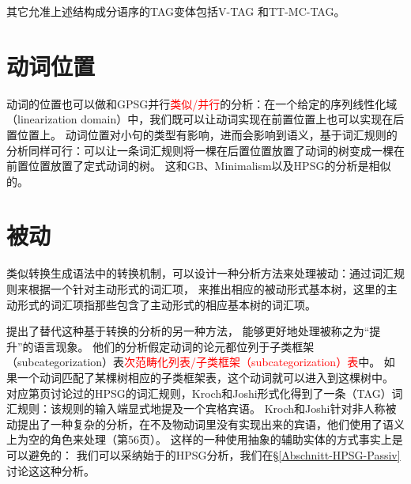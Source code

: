 其它允准上述结构成分语序的TAG变体包括V-TAG\citep{Rambow94a} 
和TT-MC-TAG\citep{Lichte2007a}。

\section{动词位置}

动词的位置也可以做和GPSG并行\textcolor{red}{类似/并行}的分析：在一个给定的序列线性化域（linearization domain）中，我们既可以让动词实现在前置位置上也可以实现在后置位置上。
动词位置对小句的类型有影响，进而会影响到语义，基于词汇规则的分析同样可行：可以让一条词汇规则将一棵在后置位置放置了动词的树变成一棵在前置位置放置了定式动词的树。
这和GB、Minimalism以及HPSG的分析是相似的。

\section{被动}

类似转换生成语法中的转换机制，可以设计一种分析方法来处理被动：通过词汇规则来根据一个针对主动形式的词汇项，
来推出相应的被动形式基本树\citep[--51]{KJ85a}，这里的主动形式的词汇项指那些包含了主动形式的相应基本树的词汇项。

\citet[]{KJ85a}提出了替代这种基于转换的分析的另一种方法，
能够更好地处理被称之为“提升”的语言现象。
他们的分析假定动词的论元都位列于子类框架（subcategorization）表\textcolor{red}{次范畴化列表/子类框架（subcategorization）表}中。
如果一个动词匹配了某棵树相应的子类框架表，这个动词就可以进入到这棵树中。
对应第\pageref{pass-lr-mlr}页讨论过的HPSG的词汇规则，Kroch和Joshi形式化得到了一条（TAG）词汇规则：该规则的输入端显式地提及一个宾格宾语。
Kroch和Joshi针对非人称被动提出了一种复杂的分析，在不及物动词里没有实现出来的宾语，他们使用了语义上为空的角色来处理（第56页）。
这样的一种使用抽象的辅助实体的方式事实上是可以避免的：
我们可以采纳始于\citet{Haider86}的HPSG\indexhpsg 分析，我们在\S \ref{Abschnitt-HPSG-Passiv}讨论这这种分析。
\largerpage

